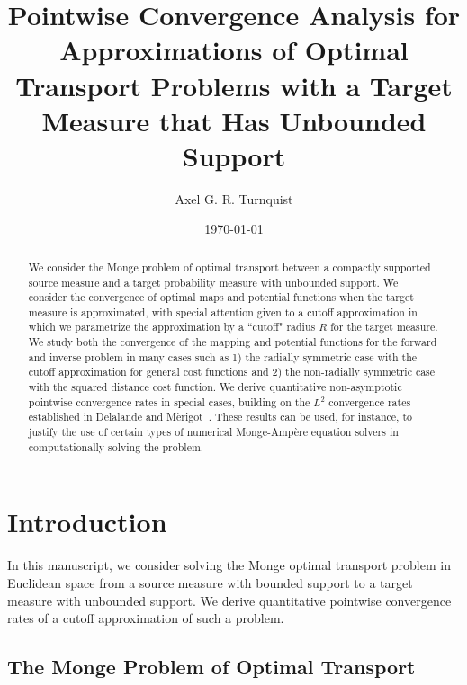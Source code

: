 \documentclass{amsart}
\theoremstyle{lemma}
\theoremstyle{remark}
\begin{document}
\title[Optimal Transport in Euclidean Space with Unbounded Support]{Pointwise Convergence Analysis for Approximations of Optimal Transport Problems with a Target Measure that Has Unbounded Support}

\author{Axel G. R. Turnquist}
\address{Beijing Institute of Mathematical Sciences and Applications, Beijing, China}

\begin{abstract}
We consider the Monge problem of optimal transport between a compactly supported source measure and a target probability measure with unbounded support. We consider the convergence of optimal maps and potential functions when the target measure is approximated, with special attention given to a cutoff approximation in which we parametrize the approximation by a ``cutoff" radius $R$ for the target measure. We study both the convergence of the mapping and potential functions for the forward and inverse problem in many cases such as 1) the radially symmetric case with the cutoff approximation for general cost functions and 2) the non-radially symmetric case with the squared distance cost function. We derive quantitative non-asymptotic pointwise convergence rates in special cases, building on the $L^2$ convergence rates established in Delalande and M\`{e}rigot~\cite{merigot1}. These results can be used, for instance, to justify the use of certain types of numerical Monge-Amp\`{e}re equation solvers in computationally solving the problem.
\end{abstract}

\date{\today}    
\maketitle
\tableofcontents

\section{Introduction}\label{sec:introduction}
In this manuscript, we consider solving the Monge optimal transport problem in Euclidean space from a source measure with bounded support to a target measure with unbounded support. We derive quantitative pointwise convergence rates of a cutoff approximation of such a problem.

\subsection{The Monge Problem of Optimal Transport}
\end{document}
